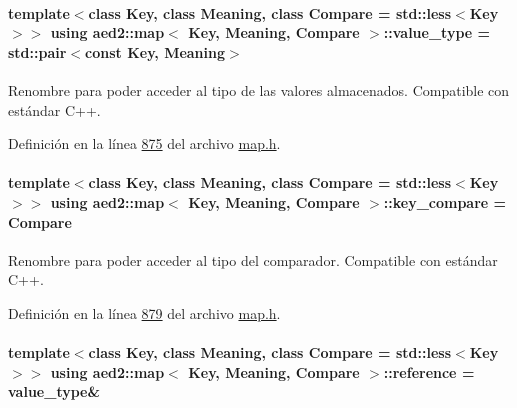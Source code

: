\paragraph[{\texorpdfstring{value\+\_\+type}{value_type}}]{\setlength{\rightskip}{0pt plus 5cm}template$<$class Key, class Meaning, class Compare = std\+::less$<$\+Key$>$$>$ using {\bf aed2\+::map}$<$ Key, Meaning, Compare $>$\+::{\bf value\+\_\+type} =  std\+::pair$<$const Key, Meaning$>$}\hypertarget{classaed2_1_1map_a719db98e0ff9a837610f76be33264680_a719db98e0ff9a837610f76be33264680}{}\label{classaed2_1_1map_a719db98e0ff9a837610f76be33264680_a719db98e0ff9a837610f76be33264680}


Renombre para poder acceder al tipo de las valores almacenados. Compatible con estándar C++. 



Definición en la línea \hyperlink{map_8h_source_l00875}{875} del archivo \hyperlink{map_8h_source}{map.\+h}.

\paragraph[{\texorpdfstring{key\+\_\+compare}{key_compare}}]{\setlength{\rightskip}{0pt plus 5cm}template$<$class Key, class Meaning, class Compare = std\+::less$<$\+Key$>$$>$ using {\bf aed2\+::map}$<$ Key, Meaning, Compare $>$\+::{\bf key\+\_\+compare} =  Compare}\hypertarget{classaed2_1_1map_a3efa081d3379ab76f33a5ef9fe697523_a3efa081d3379ab76f33a5ef9fe697523}{}\label{classaed2_1_1map_a3efa081d3379ab76f33a5ef9fe697523_a3efa081d3379ab76f33a5ef9fe697523}


Renombre para poder acceder al tipo del comparador. Compatible con estándar C++. 



Definición en la línea \hyperlink{map_8h_source_l00879}{879} del archivo \hyperlink{map_8h_source}{map.\+h}.

\paragraph[{\texorpdfstring{reference}{reference}}]{\setlength{\rightskip}{0pt plus 5cm}template$<$class Key, class Meaning, class Compare = std\+::less$<$\+Key$>$$>$ using {\bf aed2\+::map}$<$ Key, Meaning, Compare $>$\+::{\bf reference} =  {\bf value\+\_\+type}\&}\hypertarget{classaed2_1_1map_af4f147533b3c0207ab036c86ce13ec0d_af4f147533b3c0207ab036c86ce13ec0d}{}\label{classaed2_1_1map_af4f147533b3c0207ab036c86ce13ec0d_af4f147533b3c0207ab036c86ce13ec0d}


